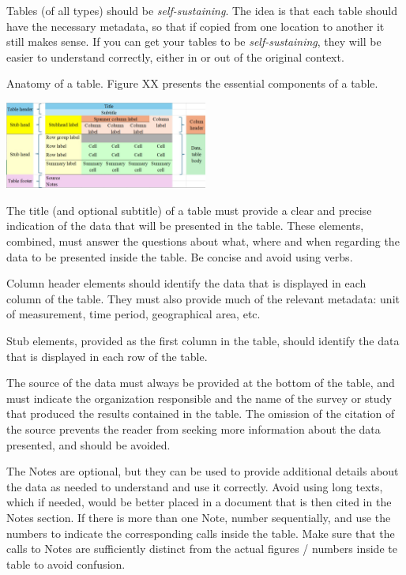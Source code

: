 \documentclass[
  12pt,
]{book}
\begin{document}
Tables (of all types) should be \emph{self-sustaining}. The idea is that each table should have the necessary metadata, so that if copied from one location to another it still makes sense. If you can get your tables to be \emph{self-sustaining}, they will be easier to understand correctly, either in or out of the original context.

Anatomy of a table. Figure XX presents the essential components of a table.

\includegraphics[width=0.5\textwidth,height=\textheight]{pics/Table1.jpg}

The title (and optional subtitle) of a table must provide a clear and precise indication of the data that will be presented in the table. These elements, combined, must answer the questions about what, where and when regarding the data to be presented inside the table. Be concise and avoid using verbs.

Column header elements should identify the data that is displayed in each column of the table. They must also provide much of the relevant metadata: unit of measurement, time period, geographical area, etc.

Stub elements, provided as the first column in the table, should identify the data that is displayed in each row of the table.

The source of the data must always be provided at the bottom of the table, and must indicate the organization responsible and the name of the survey or study that produced the results contained in the table. The omission of the citation of the source prevents the reader from seeking more information about the data presented, and should be avoided.

The Notes are optional, but they can be used to provide additional details about the data as needed to understand and use it correctly. Avoid using long texts, which if needed, would be better placed in a document that is then cited in the Notes section. If there is more than one Note, number sequentially, and use the numbers to indicate the corresponding calls inside the table. Make sure that the calls to Notes are sufficiently distinct from the actual figures / numbers inside te table to avoid confusion.
\end{document}
